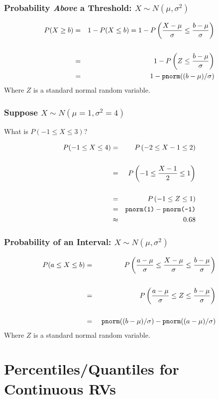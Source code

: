 \begin{frame}
  \frametitle{Probability \emph{Above} a Threshold: $X \sim N(\mu, \sigma^2)$}
\begin{eqnarray*}
	P(X \geq b) &=&1 - P(X\leq b) =1 - P\left( \frac{X-\mu}{\sigma} \leq \frac{b-\mu}{\sigma} \right) \\ \\
	&=& 1 - P\left( Z \leq \frac{b-\mu}{\sigma} \right) \\
	&=& 1 -\mbox{\texttt{pnorm}}((b-\mu)/\sigma)
\end{eqnarray*}
Where $Z$ is a standard normal random variable.
\end{frame}
\begin{frame}
  \frametitle{Suppose $X \sim N(\mu = 1, \sigma^2 = 4)$}
What is $P(-1 \leq X \leq 3)$?

\pause
\begin{eqnarray*}
P(-1 \leq X \leq 4) &=& P\left( -2 \leq X - 1 \leq 2\right)\\\\
&=& P\left( -1 \leq \frac{X-1}{2} \leq 1\right)\\ \\
	&=& P\left( -1 \leq Z \leq 1\right)\\
	&=& \mbox{\texttt{pnorm(1)}} -  \mbox{\texttt{pnorm(-1)}}\\
	&\approx& 0.68
\end{eqnarray*}
\end{frame}

\begin{frame}
\frametitle{Probability of an Interval: $X \sim N(\mu, \sigma^2)$}


\begin{eqnarray*}
	P(a \leq X \leq b) &=&  P\left( \frac{a - \mu}{\sigma} \leq \frac{X - \mu}{\sigma} \leq \frac{b-\mu}{\sigma} \right)\\ \\ 
	&=& P\left( \frac{a - \mu}{\sigma} \leq Z \leq \frac{b-\mu}{\sigma} \right)\\ \\ 
	&=&\ \mbox{\texttt{pnorm}}((b-\mu)/\sigma) -  \mbox{\texttt{pnorm}}((a-\mu)/\sigma)
\end{eqnarray*}
Where $Z$ is a standard normal random variable.
\end{frame}
\section{Percentiles/Quantiles for Continuous RVs}

